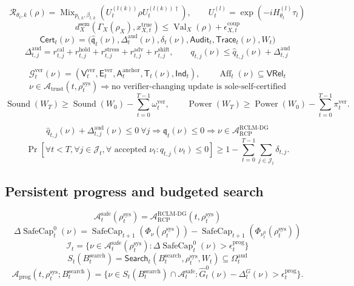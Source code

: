 \documentclass[11pt,a4paper]{article}
\newcommand{\Acal}{\mathcal A}
\newcommand{\Rcal}{\mathcal R}
\newcommand{\Gcal}{\mathcal G}
\newcommand{\calib}{\mathrm{cal}}
\newcommand{\hold}{\mathrm{hold}}
\newcommand{\stress}{\mathrm{stress}}
\newcommand{\adv}{\mathrm{adv}}
\newcommand{\shift}{\mathrm{shift}}
\newcommand{\RCP}{\mathrm{RCP}}
\newcommand{\RCLM}{\mathrm{RCLM}}
\newcommand{\DG}{\mathrm{DG}}
\newcommand{\sem}{\mathrm{sem}}
\newcommand{\sys}{\mathrm{sys}}
\newcommand{\safe}{\mathrm{safe}}
\newcommand{\true}{\mathrm{true}}
\newcommand{\aud}{\mathrm{aud}}
\newcommand{\SafeCap}{\operatorname{SafeCap}}
\newcommand{\Val}{\operatorname{Val}}
\newcommand{\Sound}{\operatorname{Sound}}
\newcommand{\Power}{\operatorname{Power}}
\newcommand{\ver}{\mathrm{ver}}
\newcommand{\search}{\mathrm{search}}
\newcommand{\coup}{\mathrm{coup}}
\newcommand{\trust}{\mathrm{trust}}
\newcommand{\anchor}{\mathrm{anchor}}
\begin{document}
\[
\Rcal_{\theta_t,k}(\rho)=
\operatorname{Mix}_{p_{t,k},\beta_{t,k}}
\left(U_t^{(l(k))}\rho U_t^{(l(k))\dagger}\right),
\qquad
U_t^{(l)}=\exp(-iH_{\theta_t}^{(l)}\tau_l)
\]
\[
d_X^{\sem}(\Gamma_X(\rho_X),x_{X,t}^{\true})
\le
\Val_X(\rho)+\epsilon_{X,t}^{\coup}
\]
\[
\mathsf{Cert}_t(\nu)=\bigl(\widehat{\mathfrak q}_t(\nu),\Delta_t^{\aud}(\nu),\delta_t(\nu),\mathsf{Audit}_t,\mathsf{Trace}_t(\nu),W_t\bigr)
\]
\[
\Delta_{t,j}^{\aud}=r_{t,j}^{\calib}+r_{t,j}^{\hold}+r_{t,j}^{\stress}+r_{t,j}^{\adv}+r_{t,j}^{\shift},
\qquad
q_{t,j}(\nu)\le\widehat q_{t,j}(\nu)+\Delta_{t,j}^{\aud}
\]

\[
\Gcal_t^{\ver}(\nu)=(\mathsf V_t^{\ver},\mathsf E_t^{\ver},\mathsf A_t^{\anchor},\mathsf T_t(\nu),\mathsf{Ind}_t),
\qquad
\operatorname{Aff}_t(\nu)\subseteq\mathsf{VRel}_t
\]
\[
\nu\in\Acal_{\trust}(t,\rho_t^{\sys})
\Longrightarrow
\text{no verifier-changing update is sole-self-certified}
\]
\[
\Sound(W_T)\ge \Sound(W_0)-\sum_{t=0}^{T-1}\omega_t^{\ver},
\qquad
\Power(W_T)\ge \Power(W_0)-\sum_{t=0}^{T-1}\pi_t^{\ver}.
\]

\[
\widehat q_{t,j}(\nu)+\Delta_{t,j}^{\aud}(\nu)\le0\ \forall j
\Rightarrow
\mathfrak q_t(\nu)\le0
\Rightarrow
\nu\in\Acal_{\RCP}^{\RCLM\text{-}\DG}
\]
\[
\Pr\left[
\forall t<T,\forall j\in\mathcal J_t,\forall\text{ accepted }\nu_t:
q_{t,j}(\nu_t)\le0
\right]
\ge
1-\sum_{t=0}^{T-1}\sum_{j\in\mathcal J_t}\delta_{t,j}.
\]


\subsection*{Persistent progress and budgeted search}
\[
\Acal_t^{\safe}(\rho_t^{\sys})=\Acal_{\RCP}^{\RCLM\text{-}\DG}(t,\rho_t^{\sys})
\]
\[
\Delta\SafeCap_t^{0}(\nu)=
\SafeCap_{t+1}(\Phi_\nu(\rho_t^{\sys}))-
\SafeCap_{t+1}(\Phi_{\nu_t^0}(\rho_t^{\sys}))
\]
\[
\mathcal I_t=
\{\nu\in\Acal_t^{\safe}(\rho_t^{\sys}):
\Delta\SafeCap_t^{0}(\nu)>\epsilon_t^{\mathrm{prog}}\}
\]
\[
S_t(B_t^{\search})=
\mathsf{Search}_t(B_t^{\search},\rho_t^{\sys},W_t)\subseteq\Omega_t^{\aud}
\]
\[
\Acal_{\mathrm{prog}}(t,\rho_t^{\sys};B_t^{\search})
=
\{\nu\in S_t(B_t^{\search})\cap\Acal_t^{\safe}:
\widehat G_t^{0}(\nu)-\Delta_t^G(\nu)>\epsilon_t^{\mathrm{prog}}\}.
\]
\end{document}
